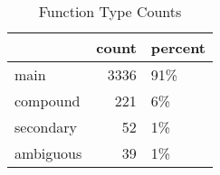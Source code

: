 \begin{table}[htbp!]
\centering
\caption{Function Type Counts}
\label{table:ALL_functype_cp}
\begin{tabular}{lrl}
\toprule
{} &  count & percent \\
\midrule
main      &   3336 &     91\% \\
compound  &    221 &      6\% \\
secondary &     52 &      1\% \\
ambiguous &     39 &      1\% \\
\bottomrule
\end{tabular}
\end{table}
